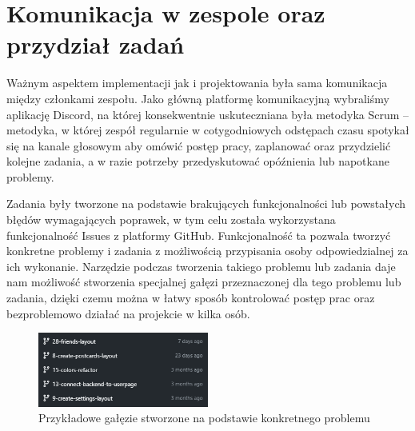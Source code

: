 \documentclass[a4paper,twoside,12pt]{book}
\begin{document}
\section{Komunikacja w zespole oraz przydział zadań}
Ważnym aspektem implementacji jak i projektowania była sama komunikacja między członkami zespołu. Jako główną platformę komunikacyjną wybraliśmy aplikację Discord, na której konsekwentnie uskuteczniana była metodyka Scrum -- metodyka, w której zespół regularnie w cotygodniowych odstępach czasu spotykał się na kanale głosowym aby omówić postęp pracy, zaplanować oraz przydzielić kolejne zadania, a w razie potrzeby przedyskutować opóźnienia lub napotkane problemy.

Zadania były tworzone na podstawie brakujących funkcjonalności lub powstałych błędów wymagających poprawek, w tym celu została wykorzystana funkcjonalność Issues z platformy GitHub. Funkcjonalność ta pozwala tworzyć konkretne problemy i zadania z możliwością przypisania osoby odpowiedzialnej za ich wykonanie. Narzędzie podczas tworzenia takiego problemu lub zadania daje nam możliwość stworzenia specjalnej gałęzi przeznaczonej dla tego problemu lub zadania, dzięki czemu można w łatwy sposób kontrolować postęp prac oraz bezproblemowo działać na projekcie w kilka osób.

\begin{figure}[H]
    \centering
    \includegraphics[width=0.5\textwidth]{github_ss/branche.png}
    \caption{Przykładowe gałęzie stworzone na podstawie konkretnego problemu}
\end{figure}
\newpage
\end{document}
